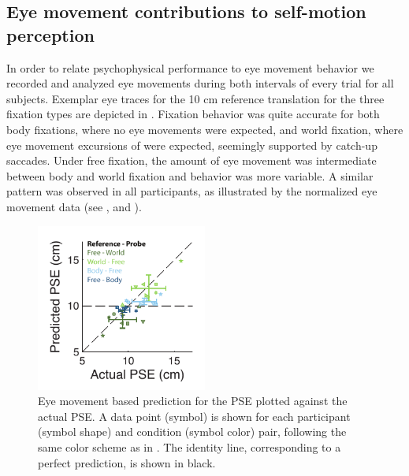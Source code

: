 \subsection{Eye movement contributions to self-motion perception}

In order to relate psychophysical performance to eye movement behavior we recorded and analyzed eye movements during both intervals of every trial for all subjects. Exemplar eye traces for the 10 \si{\centi\metre} reference translation for the three fixation types are depicted in . Fixation behavior was quite accurate for both body fixations, where no eye movements were expected, and world fixation, where eye movement excursions of  were expected, seemingly supported by  catch-up saccades. Under free fixation, the amount of eye movement was intermediate between body and world fixation and behavior was more variable. A similar pattern was observed in all participants, as illustrated by the normalized eye movement data (see , and ).

\begin{figure}
    \includegraphics[width=0.5\textwidth]{src/paper3/figure4.pdf}

    \caption{Eye movement based prediction for the PSE plotted against the actual PSE.  A data point (symbol) is shown for each participant (symbol shape) and condition (symbol color) pair, following the same color scheme as in . The identity line, corresponding to a perfect prediction, is shown in black.}
    \label{p3:fig4}
\end{figure}

